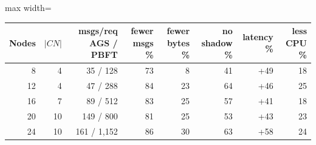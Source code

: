\begin{adjustbox}{max width=\linewidth}
\begin{tabular}{rrrrrrrr}
\toprule
Nodes & $|CN|$ & msgs/req AGS / PBFT & fewer msgs \% & fewer bytes \% & no shadow \% & latency \% & less CPU \% \\
\midrule
8 & 4 & 35 / 128 & 73 & 8 & 41 & +49 & 18 \\
12 & 4 & 47 / 288 & 84 & 23 & 64 & +46 & 25 \\
16 & 7 & 89 / 512 & 83 & 25 & 57 & +41 & 18 \\
20 & 10 & 149 / 800 & 81 & 25 & 53 & +43 & 23 \\
24 & 10 & 161 / 1{,}152 & 86 & 30 & 63 & +58 & 24 \\
\bottomrule
\end{tabular}
\end{adjustbox}
\par{}
